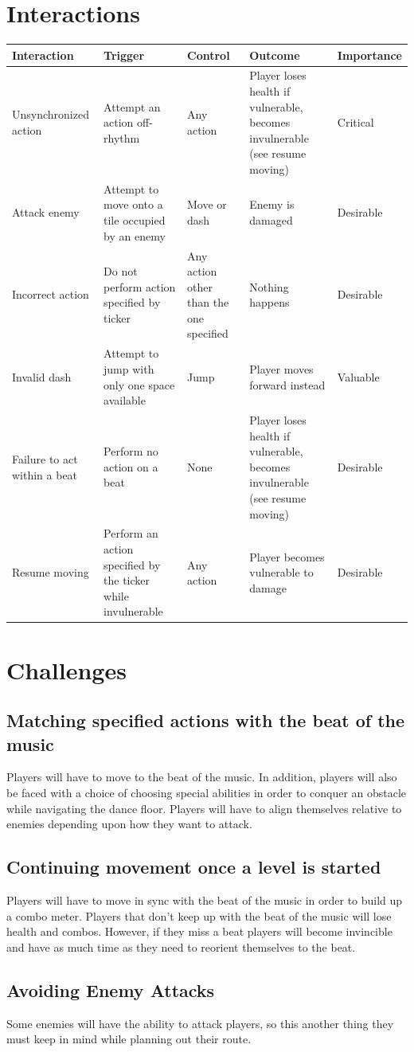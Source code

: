 \documentclass[]{article}
\begin{document}
\section*{Interactions}
\begin{table}[h]
\begin{tabular}{|l|L{4cm}|L{2cm}|L{3cm}|l|}
\hline
\textbf{Interaction} & \textbf{Trigger} & \textbf{Control}  & \textbf{Outcome} & \textbf{Importance} \\
\hline
Unsynchronized action & Attempt an action off-rhythm & Any action & 
Player loses health if vulnerable, becomes invulnerable (see resume moving)
& Critical \\
\hline 
Attack enemy & Attempt to move onto a tile occupied by an enemy & Move or dash 
& Enemy is damaged & Desirable \\
\hline
Incorrect action & Do not perform action specified by ticker & Any 
action other than the one specified & Nothing happens & Desirable \\
\hline
Invalid dash & Attempt to jump with only one space available & Jump & 
Player moves forward instead & Valuable \\
\hline
Failure to act within a beat & Perform no action on a beat      & None       & 
Player loses health if vulnerable, becomes invulnerable (see resume moving)  
& Desirable\\
\hline
Resume moving & Perform an action specified by the ticker while invulnerable &
Any action & Player becomes vulnerable to damage & Desirable\\
\hline
\end{tabular}
\end{table}

\pagebreak
\section*{Challenges}
\subsection*{Matching specified actions with the beat of the music}
Players will have to move to the beat of the music. In addition,
players will also be faced with a choice of choosing special abilities
in order to conquer an obstacle while navigating the dance
floor. Players will have to align themselves relative to enemies
depending upon how they want to attack.

\subsection*{Continuing movement once a level is started}
Players will have to move in sync with the beat of the music in order
to build up a combo meter. Players that don't keep up with the beat of
the music will lose health and combos. However, if they miss a beat
players will become invincible and have as much time as they need to
reorient themselves to the beat.

\subsection*{Avoiding Enemy Attacks}
Some enemies will have the ability to attack players, 
so this another thing they must keep in mind while planning out their route. 
\end{document}
